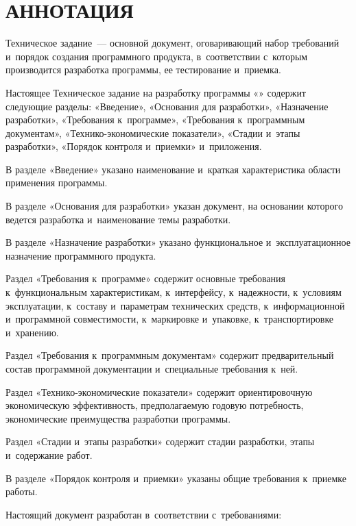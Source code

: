\documentclass[12pt,a4paper]{extarticle}
\begin{document}
\sloppy



\section*{АННОТАЦИЯ}

Техническое задание~--- основной документ, оговаривающий набор требований и~порядок создания программного продукта, в~соответствии с~которым производится разработка программы, ее тестирование и~приемка.

Настоящее Техническое задание на разработку программы «\hseProjectName» содержит следующие разделы: «Введение», «Основания для разработки», «Назначение разработки», «Требования к~программе», «Требования к~программным документам», «Технико-экономические показатели», «Стадии и~этапы разработки», «Порядок контроля и~приемки» и~приложения\cite{gost19101}.

В разделе «Введение» указано наименование и~краткая характеристика области применения программы.

В разделе «Основания для разработки» указан документ, на основании которого ведется разработка и~наименование темы разработки.

В разделе «Назначение разработки» указано функциональное и~эксплуатационное назначение программного продукта.

Раздел «Требования к~программе» содержит основные требования к~функциональным характеристикам, к~интерфейсу, к~надежности, к~условиям эксплуатации, к~составу и~параметрам технических средств, к~информационной и~программной совместимости, к~маркировке и~упаковке, к~транспортировке и~хранению.

Раздел «Требования к~программным документам» содержит предварительный состав программной документации и~специальные требования к~ней.

Раздел «Технико-экономические показатели» содержит ориентировочную экономическую эффективность, предполагаемую годовую потребность, экономические преимущества разработки программы.

Раздел «Стадии и~этапы разработки» содержит стадии разработки, этапы и~содержание работ.

В разделе «Порядок контроля и~приемки» указаны общие требования к~приемке работы.

\clearpage

\noindent
Настоящий документ разработан в~соответствии с~требованиями:
\end{document}
